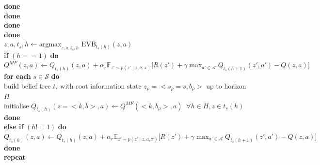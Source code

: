 \documentclass{article}
\begin{document}
\hspace*{0.5cm} \hspace*{0.5cm} \hspace*{0.5cm} \hspace*{0.5cm} \textbf{done} \\
\hspace*{0.5cm} \hspace*{0.5cm} \hspace*{0.5cm} \textbf{done}\\
\hspace*{0.5cm} \hspace*{0.5cm} \textbf{done}\\
\hspace*{0.5cm} \textbf{done}\\
\hspace*{0.5cm} $z, a, t_s, h \leftarrow \text{argmax}_{z, a, t_{s}, h} \, \, \text{EVB}_{t_{s}(h)}(z, a)$\\
\hspace*{0.5cm} \textbf{if} $(h == 1)$ \textbf{do}\\
\hspace*{0.5cm} \hspace*{0.5cm} $Q^{MF}(z, a) \leftarrow Q_{t_{s}(h)}(z, a) + \alpha_r \mathbb{E}_{z'\sim p(z'\mid z, a, \pi)}\big[R(z') + \gamma \max_{a' \in \mathcal{A}}Q_{t_{s}(h+1)}(z', a') - Q(z, a)\big]$\\
\hspace*{0.5cm} \hspace*{0.5cm} \textbf{for each} $s \in \mathcal{S}$ \textbf{do} \\
\hspace*{0.5cm} \hspace*{0.5cm} \hspace*{0.5cm} build belief tree $t_s$ with root information state $z_{\rho}=<s_{\rho}=s, b_{\rho}>$ up to horizon $H$\\
\hspace*{0.5cm} \hspace*{0.5cm} \hspace*{0.5cm} initialise $Q_{t_{s}(h)}(z=<k, b>, a) \leftarrow Q^{MF}(<k, b_{\rho}>, a) \; \; \forall h \in H, z \in t_{s}(h)$\\
\hspace*{0.5cm} \hspace*{0.5cm} \textbf{done}\\
\hspace*{0.5cm} \textbf{else if} $(h != 1)$ \textbf{do}\\
\hspace*{0.5cm} \hspace*{0.5cm} $Q_{t_{s}(h)}(z, a) \leftarrow Q_{t_{s}(h)}(z, a) + \alpha_r \mathbb{E}_{z'\sim p(z'\mid z, a, \pi)}\big[R(z') + \gamma \max_{a' \in \mathcal{A}}Q_{t_{s}(h+1)}(z', a') - Q(z, a)\big]$\\
\hspace*{0.5cm} \textbf{done}\\
\textbf{repeat}
\end{document}
